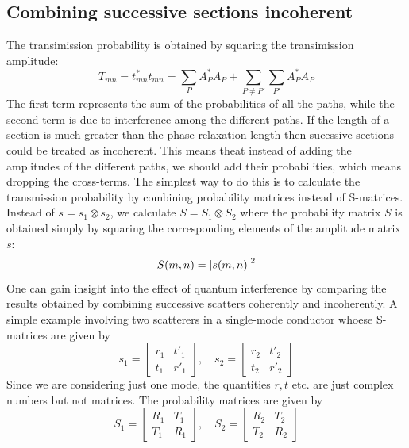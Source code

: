\documentclass[11pt,a4paper]{book}
\theoremstyle{plain}
\theoremstyle{definition}
\theoremstyle{remark}
\begin{document}
\subsection{Combining successive sections incoherent}
The transimission probability is obtained by squaring the transimission amplitude:
\begin{equation}
    T_{mn} = t_{mn}^*t_{mn} = \sum_P A_P^*A_P + \sum_{P\neq P'}\sum_{P'} A_P^*A_P
\end{equation}
The first term represents the sum of the probabilities of all the paths, while the second term is due to interference among the different paths. If the length of a section is much greater than the phase-relaxation length then sucessive sections could be treated as incoherent. This means theat instead of adding the amplitudes of the different paths, we should add their probabilities, which means dropping the cross-terms. The simplest way to do this is to calculate the transmission probability by combining probability matrices instead of S-matrices. Instead of $s=s_1\otimes s_2$, we calculate $S = S_1\otimes S_2$ where the probability matrix $S$ is obtained simply by squaring the corresponding elements of the amplitude matrix $s$:
\begin{equation}
    S(m,n) = \abs{s(m,n)}^2
\end{equation}
One can gain insight into the effect of quantum interference by comparing the results obtained by combining successive scatters coherently and incoherently. A simple example involving two scatterers in a single-mode conductor whoese S-matrices are given by
\begin{equation}
    s_1 =
    \begin{bmatrix}
        r_1 & t'_1 \\
        t_1 & r'_1
    \end{bmatrix}, \quad
    s_2 =
    \begin{bmatrix}
        r_2 & t'_2 \\
        t_2 & r'_2
    \end{bmatrix}
\end{equation}
Since we are considering just one mode, the quantities $r,t$ etc. are just complex numbers but not matrices. The probability matrices are given by
\begin{equation}
    S_1 =
    \begin{bmatrix}
        R_1 & T_1 \\
        T_1 & R_1
    \end{bmatrix}, \quad
    S_2 =
    \begin{bmatrix}
        R_2 & T_2 \\
        T_2 & R_2
    \end{bmatrix}
\end{equation}
\end{document}
